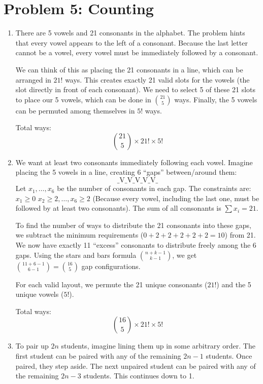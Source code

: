 \documentclass[11pt]{article}
\begin{document}
\vspace{0.5cm}

\section*{Problem 5: Counting}
\begin{enumerate}[label=\textbf{(\alph*)}]
    \item There are 5 vowels and 21 consonants in the alphabet. The problem hints that every vowel appears to the left of a consonant. Because the last letter cannot be a vowel, every vowel must be immediately followed by a consonant.

    We can think of this as placing the 21 consonants in a line, which can be arranged in $21!$ ways. This creates exactly 21 valid slots for the vowels (the slot directly in front of each consonant). We need to select 5 of these 21 slots to place our 5 vowels, which can be done in $\binom{21}{5}$ ways. Finally, the 5 vowels can be permuted among themselves in $5!$ ways.
    
    Total ways:
    $$\binom{21}{5} \times 21! \times 5!$$

    \item We want at least two consonants immediately following each vowel. Imagine placing the 5 vowels in a line, creating 6 ``gaps'' between/around them:
    $$\_ \text{V} \_ \text{V} \_ \text{V} \_ \text{V} \_ \text{V} \_$$
    Let $x_1, \dots, x_6$ be the number of consonants in each gap. The constraints are:
    $x_1 \ge 0$
    $x_2 \ge 2, \dots, x_6 \ge 2$ (Because every vowel, including the last one, must be followed by at least two consonants). 
    The sum of all consonants is $\sum x_i = 21$.
    
    To find the number of ways to distribute the 21 consonants into these gaps, we subtract the minimum requirements ($0 + 2 + 2 + 2 + 2 + 2 = 10$) from 21. We now have exactly 11 ``excess'' consonants to distribute freely among the 6 gaps. Using the stars and bars formula $\binom{n + k - 1}{k - 1}$, we get $\binom{11 + 6 - 1}{6 - 1} = \binom{16}{5}$ gap configurations. 
    
    For each valid layout, we permute the 21 unique consonants ($21!$) and the 5 unique vowels ($5!$). 
    
    Total ways:
    $$\binom{16}{5} \times 21! \times 5!$$

    \item To pair up $2n$ students, imagine lining them up in some arbitrary order. The first student can be paired with any of the remaining $2n-1$ students. Once paired, they step aside. The next unpaired student can be paired with any of the remaining $2n-3$ students. This continues down to 1.
    

\end{enumerate}
\end{document}
